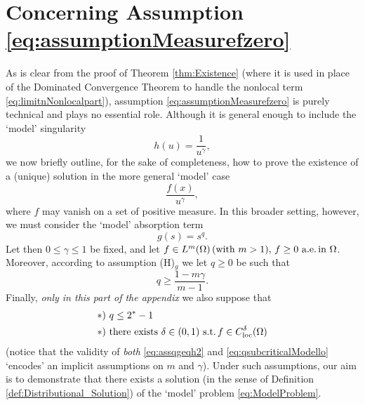 \documentclass[11pt,a4paper]{amsart}
\theoremstyle{definition}
\theoremstyle{plain}
\numberwithin{equation}{section}
\begin{document}
{\section{Concerning Assumption \eqref{eq:assumptionMeasurefzero}}\label{appendix}
As is clear from the proof of Theorem \ref{thm:Existence} (where it 
is used in place of the Dominated Convergence Theorem to handle 
the nonlocal term \eqref{eq:limitnNonlocalpart}), assumption 
\eqref{eq:assumptionMeasurefzero} is purely technical and plays 
no essential role. Although it is general enough to include the `model' singularity
$$h(u) = \frac{1}{u^\gamma},$$
we now briefly outline, for the sake of completeness, how to prove the existence of a (unique) 
solution in the more general `model' case
$$\frac{f(x)}{u^\gamma},$$
where $f$ may vanish on a set of positive measure. In this broader setting, however, we must consider the 
`model' absorption term
$$g(s) = s^q.$$
Let then $0\leq \gamma\leq 1$ be fixed, and let $f\in L^m(\Omega)\,(\text{with $m > 1$}),\,\text{$f\geq 0$ a.e.\,in $\Omega$}$.
Moreover, according to assumption (H)$_g$
we
let $q\geq 0$
be such that
\begin{equation} \label{eq:assqgeqh2}
	q\geq \frac{1-m\gamma}{m-1}.
\end{equation}
Finally, \emph{only in this part of the appendix} we also suppose that
\begin{align} 
	\ast)&\,\,q\leq 2^\ast-1 \label{eq:qsubcriticalModello} \\
	\ast)&\,\,\text{there exists $\delta \in (0,1)$ s.t.\,$f\in C^{\delta}_{\mathrm{loc}}(\Omega)$}
\end{align}
(notice that the validity of \emph{both} \eqref{eq:assqgeqh2} and \eqref{eq:qsubcriticalModello} 
`encodes'
an implicit assumptions on $m$ and $\gamma$).
Under such assumptions, our aim is to demonstrate that
there exists a solution
(in the sense of Definition \ref{def:Distributional_Solution}) of 
the `model' problem \eqref{eq:ModelProblem}.
\vspace*{0.05cm}

}
\end{document}
